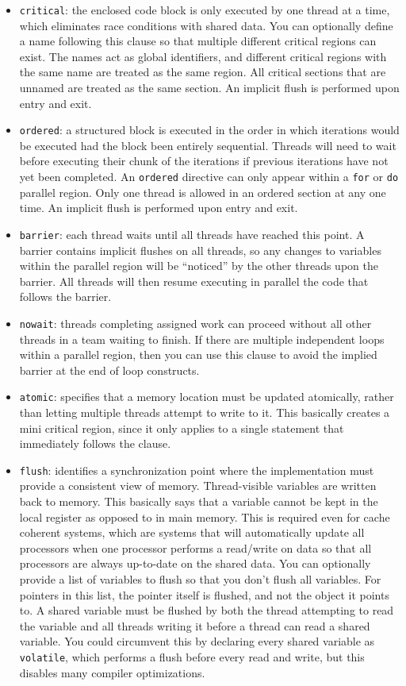 \documentclass[10pt]{article}
\begin{document}
\begin{flushleft}
\begin{itemize}
\item {\tt critical}: the enclosed code block is only executed by one thread at a time, which eliminates race conditions with shared data. You can optionally define a name following this clause so that multiple different critical regions can exist. The names act as global identifiers, and different critical regions with the same name are treated as the same region. All critical sections that are unnamed are treated as the same section. An implicit flush is performed upon entry and exit.
\item {\tt ordered}: a structured block is executed in the order in which iterations would be executed had the block been entirely sequential. Threads will need to wait before executing their chunk of the iterations if previous iterations have not yet been completed. An {\tt ordered} directive can only appear within a {\tt for} or {\tt do} parallel region. Only one thread is allowed in an ordered section at any one time. An implicit flush is performed upon entry and exit.
\item {\tt barrier}: each thread waits until all threads have reached this point. A barrier contains implicit flushes on all threads, so any changes to variables within the parallel region will be ``noticed'' by the other threads upon the barrier. All threads will then resume executing in parallel the code that follows the barrier.
\item {\tt nowait}: threads completing assigned work can proceed without all other threads in a team waiting to finish. If there are multiple independent loops within a parallel region, then you can use this clause to avoid the implied barrier at the end of loop constructs.
\item {\tt atomic}: specifies that a memory location must be updated atomically, rather than letting multiple threads attempt to write to it. This basically creates a mini critical region, since it only applies to a single statement that immediately follows the clause.
\item {\tt flush}: identifies a synchronization point where the implementation must provide a consistent view of memory. Thread-visible variables are written back to memory. This basically says that a variable cannot be kept in the local register as opposed to in main memory. This is required even for cache coherent systems, which are systems that will automatically update all processors when one processor performs a read/write on data so that all processors are always up-to-date on the shared data. You can optionally provide a list of variables to flush so that you don't flush all variables. For pointers in this list, the pointer itself is flushed, and not the object it points to. A shared variable must be flushed by both the thread attempting to read the variable and all threads writing it before a thread can read a shared variable. You could circumvent this by declaring every shared variable as {\tt volatile}, which performs a flush before every read and write, but this disables many compiler optimizations.
\end{itemize}


\end{flushleft}
\end{document}
